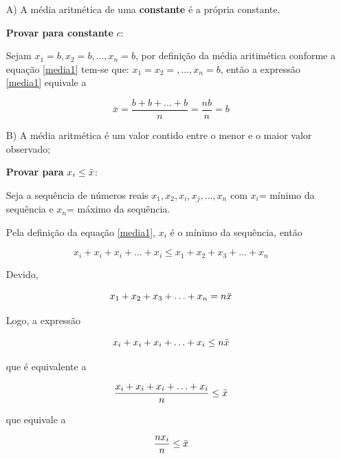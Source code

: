 \begin{enumerate}
\item [{A)}] A média aritmética de uma \textbf{constante} é a própria constante.

\vskip0.3cm
\textbf{Provar para constante} $c$: 

Sejam  $x_{1}=b, x_{2}=b, ..., x_{n}=b$, por definição da média aritimética conforme a equação \ref{media1} tem-se que: $x_{1}=x_{2}=,..., x_{n}=b$, então a expressão \ref{media1} equivale a

\begin{equation*}\label{propriedade1}
\bar{x}=\frac{b+b+...+b}{n}=\frac{nb}{n}=b
\end{equation*}
 

\item [{B)}] A média aritmética é um valor contido entre o menor e o maior valor observado; 

\vskip0.3cm
\textbf{Provar para} $x_{i} \leq \Bar{x}$: 

Seja a sequência de números reais $x_{1},x_{2},x_{i},x_{j},\ldots,x_{n}$ com $x_{i}$= mínimo da sequência e $x_{n}$= máximo da sequência. \vskip0.3cm

Pela definição da equação \ref{media1}, $x_{i}$ é o mínimo da sequência, então 

\begin{equation*}\label{propriedade1}
x_{i}+x_{i}+x_{i}+\ldots+x_{i} \leq  x_{1}+x_{2}+x_{3}+\ldots+x_{n}
\end{equation*}

Devido,

\begin{equation*}\label{propriedade1}
x_{1}+x_{2}+x_{3}+\ldots+x_{n}=n \Bar{x}
\end{equation*}

Logo, a expressão

\begin{equation*}\label{propriedade1}
x_{i}+x_{i}+x_{i}+\ldots+x_{i} \leq n \Bar{x}
\end{equation*}

que é equivalente a 

\begin{equation*}\label{propriedade1}
\frac{x_{i}+x_{i}+x_{i}+\ldots+x_{i}}{n} \leq \Bar{x}
\end{equation*}

que equivale a 

\begin{equation*}\label{propriedade1}
\frac{nx_{i}}{n} \leq \Bar{x}
\end{equation*}


\end{enumerate}
